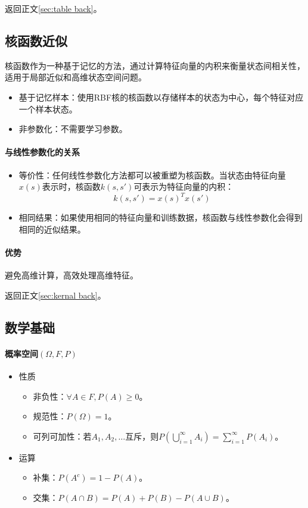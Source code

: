 \documentclass[
12pt, %
a4paper, 
oneside, %
headinclude,footinclude, %
]{scrartcl}
\begin{document}
返回正文\ref{sec:table back}。
\subsection[核函数近似]{核函数近似}\label{sec:kernal}
核函数作为一种基于记忆的方法，通过计算特征向量的内积来衡量状态间相关性，适用于局部近似和高维状态空间问题。
\begin{itemize}
\item 基于记忆样本：使用RBF核的核函数以存储样本的状态为中心，每个特征对应一个样本状态。
\item 非参数化：不需要学习参数。
\end{itemize}
\paragraph{与线性参数化的关系}
\begin{itemize}
\item 等价性：任何线性参数化方法都可以被重塑为核函数。当状态由特征向量$ x(s) $表示时，核函数$ k(s, s') $可表示为特征向量的内积：
$$ k(s, s') = x(s)^T x(s') $$
\item 相同结果：如果使用相同的特征向量和训练数据，核函数与线性参数化会得到相同的近似结果。
\end{itemize}
\paragraph{优势}
避免高维计算，高效处理高维特征。

返回正文\ref{sec:kernal back}。
\subsection[数学基础]{数学基础}
\paragraph{概率空间$ (\Omega, F, P) $}
\begin{itemize}
\item 性质
\begin{itemize}
\item 非负性：$ \forall A \in F,P(A) \geq 0 $。
\item 规范性：$ P(\Omega) = 1 $。
\item 可列可加性：若$ A_1, A_2, \dots $互斥，则$ P(\bigcup_{i = 1}^{\infty} A_i) = \sum_{i = 1}^{\infty} P(A_i) $。
\end{itemize}
\item 运算
\begin{itemize}
\item 补集：$ P(A^c) = 1 - P(A) $。
\item 交集：$ P(A \cap B) = P(A) + P(B) - P(A \cup B) $。
\end{itemize}
\end{itemize}
\end{document}
